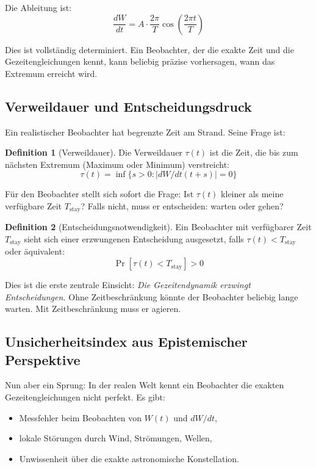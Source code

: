 \documentclass[a4paper,12pt]{article}
\theoremstyle{definition}
\newtheorem{definition}{Definition}
\begin{document}
Die Ableitung ist:
\begin{equation}
    \frac{dW}{dt} = A \cdot \frac{2\pi}{T} \cos\left(\frac{2\pi t}{T}\right)
\end{equation}

Dies ist vollständig determiniert. Ein Beobachter, der die exakte Zeit und die Gezeitengleichungen kennt, kann beliebig präzise vorhersagen, wann das Extremum erreicht wird.

\subsection{Verweildauer und Entscheidungsdruck}

Ein realistischer Beobachter hat begrenzte Zeit am Strand. Seine Frage ist:

\begin{definition}[Verweildauer]
    Die Verweildauer $\tau(t)$ ist die Zeit, die bis zum nächsten Extremum (Maximum oder Minimum) verstreicht:
    \begin{equation}
        \tau(t) = \inf\{s > 0 : |dW/dt(t+s)| = 0\}
    \end{equation}
\end{definition}

Für den Beobachter stellt sich sofort die Frage: Ist $\tau(t)$ kleiner als meine verfügbare Zeit $T_{\text{stay}}$? Falls nicht, muss er entscheiden: warten oder gehen?

\begin{definition}[Entscheidungsnotwendigkeit]
    Ein Beobachter mit verfügbarer Zeit $T_{\text{stay}}$ sieht sich einer erzwungenen Entscheidung ausgesetzt, falls $\tau(t) < T_{\text{stay}}$ oder äquivalent:
    \begin{equation}
        \Pr[\tau(t) < T_{\text{stay}}] > 0
    \end{equation}
\end{definition}

Dies ist die erste zentrale Einsicht: \emph{Die Gezeitendynamik erzwingt Entscheidungen.} Ohne Zeitbeschränkung könnte der Beobachter beliebig lange warten. Mit Zeitbeschränkung muss er agieren.

\subsection{Unsicherheitsindex aus Epistemischer Perspektive}

Nun aber ein Sprung: In der realen Welt kennt ein Beobachter die exakten Gezeitengleichungen nicht perfekt. Es gibt:
\begin{itemize}
    \item Messfehler beim Beobachten von $W(t)$ und $dW/dt$,
    \item lokale Störungen durch Wind, Strömungen, Wellen,
    \item Unwissenheit über die exakte astronomische Konstellation.
\end{itemize}
\end{document}
